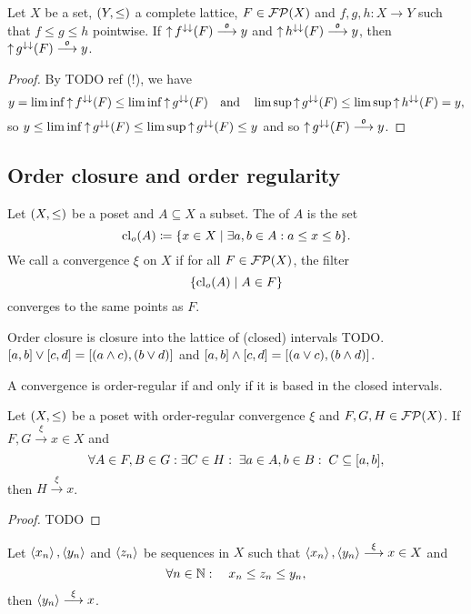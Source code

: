 \begin{proposition} \label{squeezeTheorem}
Let $X$ be a set, $\left( Y,\leq \right)$ a complete lattice, $F\in \operatorname{\mathcal{FP}}(X)$ and $f,g,h: X\to Y$ such that $f\leq g\leq h$ pointwise. If $\operatorname{\uparrow} f^{\downarrow\downarrow}(F) \overset{\mathfrak{o}}{\longrightarrow} y$ and $\operatorname{\uparrow} h^{\downarrow\downarrow}(F) \overset{\mathfrak{o}}{\longrightarrow} y$, then $\operatorname{\uparrow} g^{\downarrow\downarrow}(F) \overset{\mathfrak{o}}{\longrightarrow} y$.
\end{proposition}
\begin{proof}
By TODO ref (!), we have
\[ y = \liminf \operatorname{\uparrow} f^{\downarrow\downarrow}(F) \leq \liminf \operatorname{\uparrow} g^{\downarrow\downarrow}(F) \quad\text{and}\quad \limsup \operatorname{\uparrow} g^{\downarrow\downarrow}(F) \leq \limsup \operatorname{\uparrow} h^{\downarrow\downarrow}(F) = y, \]
so $y\leq \liminf \operatorname{\uparrow} g^{\downarrow\downarrow}(F) \leq \limsup \operatorname{\uparrow} g^{\downarrow\downarrow}(F) \leq y$ and so $\operatorname{\uparrow} g^{\downarrow\downarrow}(F) \overset{\mathfrak{o}}{\longrightarrow} y$.
\end{proof}

\subsection{Order closure and order regularity}
\begin{definition}
Let $\left( X, \leq \right)$ be a poset and $A\subseteq X$ a subset. The  of $A$ is the set
\[ \closure_o(A) \defeq \setbuilder{x\in X}{\exists a,b\in A: a\leq x\leq b}. \]
We call a convergence $\xi$ on $X$  if for all $F\in \operatorname{\mathcal{FP}}(X)$, the filter
\[ \setbuilder{\closure_o(A)}{A\in F} \]
converges to the same points as $F$.
\end{definition}
Order closure is closure into the lattice of (closed) intervals TODO. $\interval{a,b}\vee \interval{c,d} = \interval{(a\wedge c), (b\vee d)}$ and $\interval{a,b}\wedge \interval{c,d} = \interval{(a\vee c), (b\wedge d)}$.


\begin{lemma}
A convergence is order-regular \textup{if and only if} it is based in the closed intervals.
\end{lemma}

\begin{proposition}
Let $\left( X,\leq \right)$ be a poset with order-regular convergence $\xi$ and $F,G,H\in \operatorname{\mathcal{FP}}(X)$. If $F,G\overset{\xi}{\longrightarrow} x\in X$ and
\[ \forall A\in F,B\in G: \exists C\in H: \;\exists a\in A, b\in B:\; C\subseteq \interval{a,b},  \]
then $H\overset{\xi}{\longrightarrow} x$.
\end{proposition}
\begin{proof}
TODO
\end{proof}
\begin{corollary}
Let $\left\langle x_n \right\rangle, \left\langle y_n \right\rangle$ and $\left\langle z_n \right\rangle$ be sequences in $X$ such that $\left\langle x_n \right\rangle, \left\langle y_n \right\rangle\overset{\xi}{\longrightarrow} x\in X$ and
\[ \forall n\in \mathbb{N}: \quad x_n \leq z_n \leq y_n, \]
then $\left\langle y_n \right\rangle \overset{\xi}{\longrightarrow} x$.
\end{corollary}

